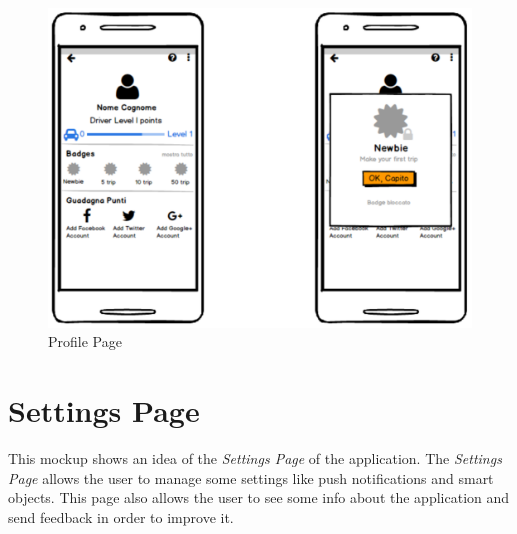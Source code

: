\begin{figure}[htbp]
\centering
\includegraphics[width=\textwidth]{cpt/img/ProfilePage.png}
\caption{Profile Page}
\end{figure}

\clearpage
\section{Settings Page}
This mockup shows an idea of the \textit{Settings Page} of the application. The \textit{Settings Page} allows the user to manage some settings like push notifications and smart objects. This page also allows the user to see some info about the application and send feedback in order to improve it.\\

